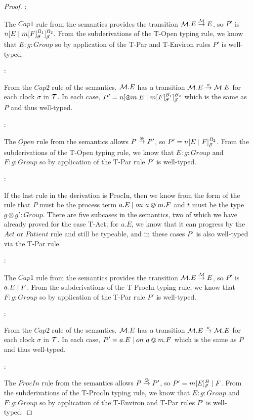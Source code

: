 \begin{proof}
:

\noindent The $Cap1$ rule from the semantics provides the transition
$\text{$\mathcal{M}$}.E \stackrel{\text{$\mathcal{M}$}}{\rightarrow} E$, so $P'$ is ${n}[ E \;|\;
  {m}[ F ]^{B_1}_{\vec{\sigma}} ]^{B_2}_{\vec{\rho}}$.  From the
subderivations of the T-Open typing rule, we know that $E : g : Group$
so by application of the T-Par and T-Environ rules $P'$ is well-typed.

:

\noindent From the $Cap2$ rule of the semantics, $\text{$\mathcal{M}$}.E$ has a
transition $\text{$\mathcal{M}$}.E \stackrel{\sigma}{\rightarrow} \text{$\mathcal{M}$}.E$ for each clock
$\sigma$ in $\text{$\mathcal{T}$}$.  In each case, $P' = {n}[ \varoast m.E \;|\;
  {m}[ F ]^{B_1}_{\vec{\sigma}} ]^{B_2}_{\vec{\rho}}$ which is the same
as $P$ and thus well-typed.

:

\noindent The $Open$ rule from the semantics allows $P
\stackrel{\varoast}{\rightarrow} P'$, so $P' = {n}[ E \;|\; F ]^{B_2}_{\vec{\rho}}$.
From the subderivations of the T-Open typing rule, we know that $E : g
: Group$ and $F : g : Group$ so by application of the T-Par rule $P'$
is well-typed.

:

\noindent If the last rule in the derivation is ProcIn, then we know
from the form of the rule that $P$ must be the process term $a.E \;|\;
on\ a \varovee m.F$ and $t$ must be the type $g \otimes g': Group$.
There are five subcases in the semantics, two of which we have already
proved for the case T-Act; for $a.E$, we know that it can progress by
the $Act$ or $Patient$ rule and still be typeable, and in these cases
$P'$ is also well-typed via the T-Par rule.

:

\noindent The $Cap1$ rule from the semantics provides the transition
$\text{$\mathcal{M}$}.E \stackrel{\text{$\mathcal{M}$}}{\rightarrow} E$, so $P'$ is $a.E \;|\; F$.  From the
subderivations of the T-ProcIn typing rule, we know that $F : g : Group$
so by application of the T-Par rule $P'$ is well-typed.

:

\noindent From the $Cap2$ rule of the semantics, $\text{$\mathcal{M}$}.E$ has a
transition $\text{$\mathcal{M}$}.E \stackrel{\sigma}{\rightarrow} \text{$\mathcal{M}$}.E$ for each clock
$\sigma$ in $\text{$\mathcal{T}$}$.  In each case, $P' = a.E \;|\; on\ a \varovee m.F$
which is the same as $P$ and thus well-typed.

:

\noindent The $ProcIn$ rule from the semantics allows $P
\stackrel{\varovee}{\rightarrow} P'$, so $P' = {m}[ E ]^{B}_{\vec{\sigma}} \;|\; F$.
From the subderivations of the T-ProcIn typing rule, we know that $E :
g : Group$ and $F : g : Group$ so by application of the T-Environ and
T-Par rules $P'$ is well-typed.


\end{proof}
